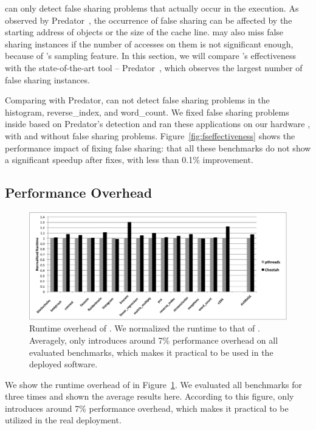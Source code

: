 \cheetah{} can only detect false sharing problems that actually occur in the execution. As observed by Predator~\cite{Predator}, the occurrence of false sharing can be affected by the starting address of objects or the size of the cache line. \cheetah{} may also miss false sharing instances if the number of accesses on them is not significant enough, because of \cheetah{}'s sampling feature. In this section, we will compare \cheetah{}'s effectiveness with the state-of-the-art tool -- Predator~\cite{Predator}, which observes the largest number of false sharing instances. 

Comparing with Predator, \cheetah{} can not detect false sharing problems in the histogram, reverse\_index, and word\_count. We fixed false sharing problems inside based on Predator's detection and ran these applications on our hardware , with and without false sharing problems. Figure~\ref{fig:fseffectiveness} shows the performance impact of fixing false sharing: that all these benchmarks do not show a significant speedup after fixes, with less than 0.1\% improvement.  

\subsection{Performance Overhead}
\label{sec:perf}

\begin{figure}[htbp]
\centering
\label{fig:overhead}
\includegraphics[width=2\columnwidth]{figure/Overhead.pdf}
\caption{Runtime overhead of \Cheetah{}. We normalized the runtime to that of \pthreads{}. Averagely, \cheetah{} only introduces around 7\% performance overhead on all evaluated benchmarks, which makes it practical to be used in the deployed software. }
\end{figure}

We show the runtime overhead of \cheetah{} in Figure~\ref{fig:overhead}. We evaluated all benchmarks for three times and shown the average results here. According to this figure, \cheetah{} only introduces around 7\% performance overhead, which makes it practical to be utilized in the real deployment. 

